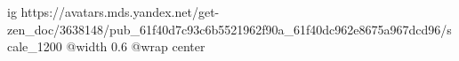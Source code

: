  
 
 
 
 

\ifcmt
  ig https://avatars.mds.yandex.net/get-zen_doc/3638148/pub_61f40d7c93c6b5521962f90a_61f40dc962e8675a967dcd96/scale_1200
  @width 0.6
	@wrap center
\fi
